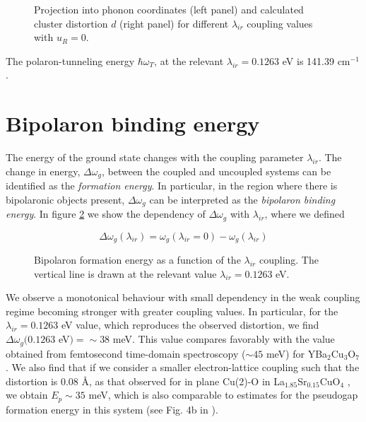 \begin{figure}[ht!]
  \centering
  
  \caption{Projection into phonon coordinates (left panel) and calculated cluster distortion $d$ (right panel) for different $\lambda_{ir}$ coupling values with $u_R=0$.}
  \label{fig:uir-vs-coupl}
\end{figure}

The polaron-tunneling energy $\hbar\omega_T$, at the relevant $\lambda_{ir}=0.1263$ eV is 141.39 cm$^{-1}$.

\section{Bipolaron binding energy}
\label{sec:grd-binding-energy}

The energy of the ground state changes with the coupling parameter $\lambda_{ir}$.
The change in energy, $\Delta\omega_{g}$, between the coupled and uncoupled systems can be identified as the \textit{formation energy}.
In particular, in the region where there is bipolaronic objects present, $\Delta\omega_{g}$ can be interpreted as the \textit{bipolaron binding energy}. 
In figure \ref{fig:polaronFormation} we show the dependency of $\Delta\omega_{g}$ with $\lambda_{ir}$, where we defined

\begin{equation}
  \label{eq:pol-energy}
  \Delta\omega_{g}(\lambda_{ir}) = \omega_{g}(\lambda_{ir} = 0) - \omega_{g}(\lambda_{ir})
\end{equation}

\begin{figure}
  \centering
  
  \caption{Bipolaron formation energy as a function of the $\lambda_{ir}$ coupling. The vertical line is drawn at the relevant value $\lambda_{ir}=0.1263$ eV.}
  \label{fig:polaronFormation}
\end{figure}

We observe a monotonical behaviour with small dependency in the weak coupling regime becoming stronger with greater coupling values.
In particular, for the $\lambda_{ir}=0.1263$ eV value, which reproduces the observed distortion, we find $\Delta\omega_{g}(0.1263$ eV$) = \sim 38$ meV.
This value compares favorably with the value obtained from femtosecond time-domain spectroscopy ($\sim 45$ meV) for YBa$_2$Cu$_3$O$_7$ \cite{Demsar1999}. 
We also find that if we consider a smaller electron-lattice coupling such that the distortion is 0.08 \AA, as that observed for in plane Cu(2)-O in La$_{1.85}$Sr$_{0.15}$CuO$_4$ \cite{Bianconi1996}, we obtain $E_p \sim 35$ meV, which is also comparable to estimates for the pseudogap formation energy in this system (see Fig. 4b in \cite{Kusar2005}).

